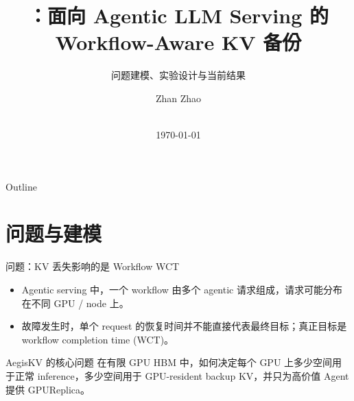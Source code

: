 \documentclass[aspectratio=43]{beamer}
\title{\AegisKV{}：面向 Agentic LLM Serving 的 Workflow-Aware KV 备份}
\subtitle{问题建模、实验设计与当前结果}
\author[Z Zhao]{Zhan Zhao}
\institute[HKBU]{Hong Kong Baptist University}
\date[\today]{\meetingname\\\today}
\newcommand{\tightitems}{\setlength{\itemsep}{2pt}\setlength{\parskip}{0pt}}
\begin{document}
\begin{frame}[plain]
  \titlepage
\end{frame}

\begin{frame}{Outline}
  \tableofcontents
\end{frame}

\section{问题与建模}

\begin{frame}{问题：KV 丢失影响的是 Workflow WCT}
  \small
  \begin{itemize}
    \tightitems
    \item Agentic serving 中，一个 workflow 由多个 agentic 请求组成，请求可能分布在不同 GPU / node 上。
    \item 故障发生时，单个 request 的恢复时间并不能直接代表最终目标；真正目标是 workflow completion time (WCT)。
  \end{itemize}

  \vspace{0.3cm}
  \begin{block}{AegisKV 的核心问题}
    在有限 GPU HBM 中，如何决定每个 GPU 上多少空间用于正常 inference，多少空间用于 GPU-resident backup KV，并只为高价值 Agent 提供 GPUReplica。
  \end{block}
\end{frame}
\end{document}
